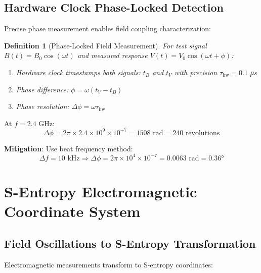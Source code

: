 \documentclass[12pt,a4paper]{article}
\newtheorem{definition}{Definition}
\begin{document}
\subsection{Hardware Clock Phase-Locked Detection}

Precise phase measurement enables field coupling characterization:

\begin{definition}[Phase-Locked Field Measurement]
For test signal $B(t) = B_0 \cos(\omega t)$ and measured response $V(t) = V_0 \cos(\omega t + \phi)$:
\begin{enumerate}
\item Hardware clock timestamps both signals: $t_B$ and $t_V$ with precision $\tau_{\text{hw}} = 0.1$ μs
\item Phase difference: $\phi = \omega (t_V - t_B)$
\item Phase resolution: $\Delta \phi = \omega \tau_{\text{hw}}$
\end{enumerate}
\end{definition}

At $f = 2.4$ GHz:
\begin{equation}
\Delta \phi = 2\pi \times 2.4 \times 10^9 \times 10^{-7} = 1508 \text{ rad} = 240 \text{ revolutions}
\end{equation}

\textbf{Mitigation}: Use beat frequency method:
\begin{equation}
\Delta f = 10 \text{ kHz} \Rightarrow \Delta \phi = 2\pi \times 10^4 \times 10^{-7} = 0.0063 \text{ rad} = 0.36°
\end{equation}

\section{S-Entropy Electromagnetic Coordinate System}

\subsection{Field Oscillations to S-Entropy Transformation}

Electromagnetic measurements transform to S-entropy coordinates:
\end{document}
